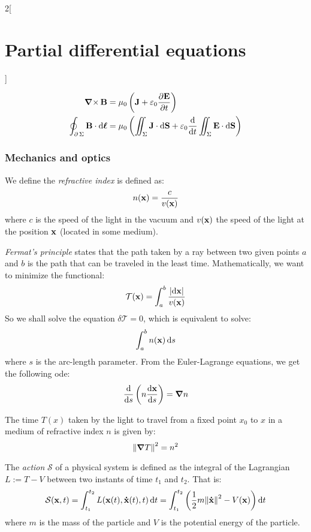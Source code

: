 \documentclass[../../../main_math.tex]{subfiles}
\begin{document}
\begin{multicols}{2}[\section{Partial differential equations}]
\begin{proposition}
    \begin{align*}
      \operatorname{\boldsymbol{\mathrm{\nabla}}\times}\boldsymbol{\mathrm{B}}                                   & =\mu_0\left(\boldsymbol{\mathrm{J}}+\varepsilon_0\pdv{\boldsymbol{\mathrm{E}}}{t}\right)                                                          \\
      \oint_{\operatorname{\partial}{\Sigma}}\boldsymbol{\mathrm{B}}\cdot \dd{\boldsymbol{\mathrm{\ell}}} & =\mu_0 \left(\iint_\Sigma\boldsymbol{\mathrm{J}}\cdot\dd{\boldsymbol{\mathrm{S}}}+\varepsilon_0\dv{}{t}\iint_\Sigma\boldsymbol{\mathrm{E}}\cdot \dd{\boldsymbol{\mathrm{S}}}\right)
    \end{align*}
  \end{proposition}
  \subsubsection{Mechanics and optics}
  \begin{definition}
    We define the \emph{refractive index} is defined as: $$n(\boldsymbol{\mathrm{x}})=\frac{c}{v(\boldsymbol{\mathrm{x}})}$$ where $c$ is the speed of the light in the vacuum and $v(\boldsymbol{\mathrm{x}})$ the speed of the light at the position $\boldsymbol{\mathrm{x}}$ (located in some medium).
  \end{definition}
  \begin{proposition}
    \emph{Fermat's principle} states that the path taken by a ray between two given points $a$ and $b$ is the path that can be traveled in the least time. Mathematically, we want to minimize the functional: $$\mathcal{T}(\boldsymbol{\mathrm{x}})=\int_a^b\frac{\abs{\dd{\boldsymbol{\mathrm{x}}}}}{v(\boldsymbol{\mathrm{x}})}$$
    So we shall solve the equation $\delta \mathcal{T}=0$, which is equivalent to solve: $$\int_a^bn(\boldsymbol{\mathrm{x}})\dd{s}$$ where $s$ is the arc-length parameter. From the Euler-Lagrange equations, we get the following ode: $$\dv{}{s}\left(n\dv{\boldsymbol{\mathrm{x}}}{s}\right)=\grad{n}$$
  \end{proposition}
  \begin{proposition}
    The time $T(x)$ taken by the light to travel from a fixed point $x_0$ to $x$ in a medium of refractive index $n$ is given by: $${\left\|\grad{T}\right\|}^2=n^2$$
  \end{proposition}
  \begin{definition}
    The \emph{action} $\mathcal{S}$ of a physical system is defined as the integral of the Lagrangian $L:=T-V$ between two instants of time $t_1$ and $t_2$. That is: $$\mathcal{S}(\boldsymbol{\mathrm{x}},t)=\int_{t_1}^{t_2}L(\boldsymbol{\mathrm{x}}(t),\boldsymbol{\mathrm{\dot{x}}}(t),t)\dd{t}=\int_{t_1}^{t_2}\left(\frac{1}{2}m{\left\|\boldsymbol{\mathrm{\dot{x}}}\right\|}^2-V(\boldsymbol{\mathrm{x}})\right)\dd{t}$$
    where $m$ is the mass of the particle and $V$ is the potential energy of the particle.
  \end{definition}

\end{multicols}
\end{document}
